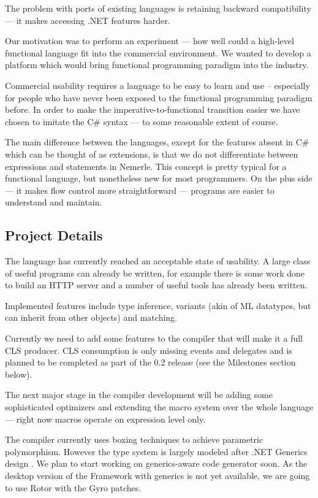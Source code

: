 \documentclass[a4paper,11pt]{article}
\begin{document}
The problem with ports of existing languages is retaining backward
compatibility --- it makes accessing .NET features harder.

Our motivation was to perform an experiment --- how well could a high-level
functional language fit into the commercial environment. We wanted to
develop a platform which would bring functional programming paradigm
into the industry.

Commercial usability requires a language to be easy to learn and
use -- especially for people who have never been exposed to the
functional programming paradigm before.  In order to make the
imperative-to-functional transition easier we have chosen to imitate
the C\# syntax --- to some reasonable extent of course.

The main difference between the languages, except for the features absent
in C\# which can be thought of as extensions, is that we do not
differentiate between expressions and statements in Nemerle. This
concept is pretty typical for a functional language, but nonetheless
new for most programmers.  On the plus side --- it makes flow control
more straightforward --- programs are easier to understand and maintain.


\subsection{Project Details}

The language has currently reached an acceptable state of usability.
A large class of useful programs can already be written, for example
there is some work done to build an HTTP server and a number of
useful tools has already been written.

Implemented features include type inference, variants (akin of ML
datatypes, but can inherit from other objects) and matching.

Currently we need to add some features to the compiler that will make
it a full CLS producer. CLS consumption is only missing events and
delegates and is planned to be completed as part of the 0.2 release
(see the Milestones section below).

The next major stage in the compiler development will be adding some
sophisticated optimizers and extending the macro system over the whole
language --- right now macros operate on expression level only.

The compiler currently uses boxing techniques to achieve parametric
polymorphism.  However the type system is largely modeled after .NET
Generics design \cite{generics}. We plan to start working on 
generics-aware code generator soon. As the desktop version of 
the Framework with generics is not yet available, we are going
to use Rotor with the Gyro patches.
\end{document}
